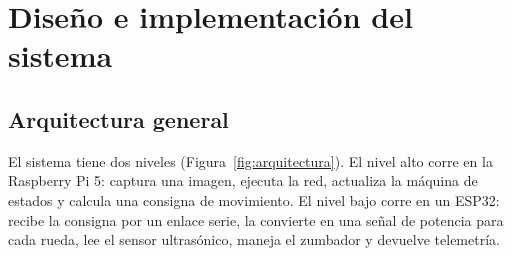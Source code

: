 \documentclass[pdflatex,sn-mathphys-num]{sn-jnl}
\begin{document}
\section{Dise\~no e implementaci\'on del sistema}\label{sec:diseno}

\subsection{Arquitectura general}

El sistema tiene dos niveles (Figura~\ref{fig:arquitectura}). El nivel alto
corre en la Raspberry Pi 5: captura una imagen, ejecuta la red, actualiza la
m\'aquina de estados y calcula una consigna de movimiento. El nivel bajo corre
en un ESP32: recibe la consigna por un enlace serie, la convierte en una
se\~nal de potencia para cada rueda, lee el sensor ultras\'onico, maneja el
zumbador y devuelve telemetr\'ia.
\end{document}
